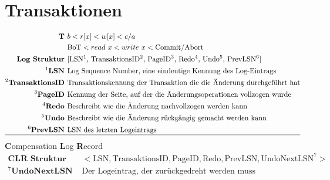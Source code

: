 \documentclass{article}
\begin{document}
	\section*{Transaktionen}
		\begin{align*}
			\textbf{T } & b < r[x] < w[x] < c/a \\
			& \text{BoT} < read\ x < write\ x < \text{Commit/Abort}\\
			\textbf{Log Struktur } 		& [\text{LSN$^1$, TransaktionsID$^2$, PageID$^3$, Redo$^4$, Undo$^5$, PrevLSN$^6$}]\\
			^1\textbf{LSN } 			& \text{Log Sequence Number, eine eindeutige Kennung des Log-Eintrags}\\
			^2\textbf{TransaktionsID } 	& \text{Transaktionskennung der Transaktion die die \"Anderung durchgef\"uhrt hat}\\
			^3\textbf{PageID } 			& \text{Kennung der Seite, auf der die \"Anderungsoperationen vollzogen wurde}\\
			^4\textbf{Redo } 			& \text{Beschreibt wie die \"Anderung nachvollzogen werden kann}\\
			^5\textbf{Undo } 			& \text{Beschreibt wie die \"Anderung r\"uckg\"angig gemacht werden kann}\\
			^6\textbf{PrevLSN } 		& \text{LSN des letzten Logeintrags}\\\hline
		\end{align*}
		\textbf{C}ompensation \textbf{L}og \textbf{R}ecord
		\begin{align*}
			\textbf{CLR Struktur } & <\text{LSN}, \text{TransaktionsID}, \text{PageID}, \text{Redo}, \text{PrevLSN}, \text{UndoNextLSN}^7>\\
			^7\textbf{UndoNextLSN } & \text{Der Logeintrag, der zur\"uckgedreht werden muss}\\
		\end{align*}
\end{document}
